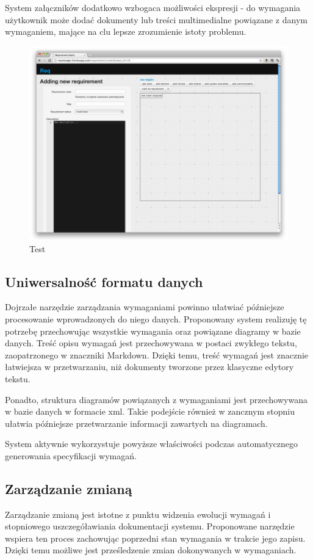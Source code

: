       System załączników dodatkowo wzbogaca możliwości ekspresji - do wymagania użytkownik może dodać dokumenty lub treści multimedialne powiązane z danym wymaganiem, mające na clu lepsze zrozumienie istoty problemu.

      \begin{figure}[t]
        \centering
        \includegraphics[width=1.0\textwidth]{screen_test.pdf}
        \caption{Test}
      \end{figure}

    \subsection{Uniwersalność formatu danych}
      Dojrzałe narzędzie zarządzania wymaganiami powinno ułatwiać późniejsze procesowanie wprowadzonych do niego danych. Proponowany system realizuję tę potrzebę przechowując wszystkie wymagania oraz powiązane diagramy w bazie danych. Treść opisu wymagań jest przechowywana w postaci zwykłego tekstu, zaopatrzonego w znaczniki Markdown. Dzięki temu, treść wymagań jest znacznie łatwiejsza w przetwarzaniu, niż dokumenty tworzone przez klasyczne edytory tekstu.
      
      Ponadto, struktura diagramów powiązanych z wymaganiami jest przechowywana w bazie danych w formacie xml. Takie podejście również w zancznym stopniu ułatwia późniejsze przetwarzanie informacji zawartych na diagramach. 
      
      System aktywnie wykorzystuje powyższe właściwości podczas automatycznego generowania specyfikacji wymagań.

    \subsection{Zarządzanie zmianą}
      Zarządzanie zmianą jest istotne z punktu widzenia ewolucji wymagań i stopniowego uszczegóławiania dokumentacji systemu. Proponowane narzędzie wspiera ten proces zachowując poprzedni stan wymagania w trakcie jego zapisu. Dzięki temu możliwe jest prześledzenie zmian dokonywanych w wymaganiach. 

